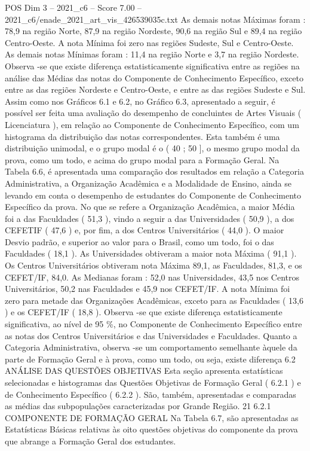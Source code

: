 \begin{textsample}{POS Dim 3 – 2021\_c6 – Score 7.00 – 2021\_c6/enade\_2021\_art\_vis\_426539035c.txt}
As demais notas Máximas foram : 78,9 na região Norte, 87,9 na região Nordeste, 90,6 na região Sul e 89,4 na região Centro-Oeste.
A nota Mínima foi zero nas regiões Sudeste, Sul e Centro-Oeste.
As demais notas Mínimas foram : 11,4 na região Norte e 3,7 na região Nordeste.
Observa -se que existe diferença estatisticamente significativa entre as regiões na análise das Médias das notas do Componente de Conhecimento Específico, exceto entre as das regiões Nordeste e Centro-Oeste, e entre as das regiões Sudeste e Sul.
Assim como nos Gráficos 6.1 e 6.2, no Gráfico 6.3, apresentado a seguir, é possível ser feita uma avaliação do desempenho de concluintes de Artes Visuais ( Licenciatura ), em relação ao Componente de Conhecimento Específico, com um histograma da distribuição das notas correspondentes.
Esta também é uma distribuição unimodal, e o grupo modal é o ( 40 ; 50 ], o mesmo grupo modal da prova, como um todo, e acima do grupo modal para a Formação Geral.
Na Tabela 6.6, é apresentada uma comparação dos resultados em relação a Categoria Administrativa, a Organização Acadêmica e a Modalidade de Ensino, ainda se levando em conta o desempenho de estudantes do Componente de Conhecimento Específico da prova.
No que se refere a Organização Acadêmica, a maior Média foi a das Faculdades ( 51,3 ), vindo a seguir a das Universidades ( 50,9 ), a dos CEFETIF ( 47,6 ) e, por fim, a dos Centros Universitários ( 44,0 ).
O maior Desvio padrão, e superior ao valor para o Brasil, como um todo, foi o das Faculdades ( 18,1 ).
As Universidades obtiveram a maior nota Máxima ( 91,1 ).
Os Centros Universitários obtiveram nota Máxima 89,1, as Faculdades, 81,3, e os CEFET/IF, 84,0.
As Medianas foram : 52,0 nas Universidades, 43,5 nos Centros Universitários, 50,2 nas Faculdades e 45,9 nos CEFET/IF.
A nota Mínima foi zero para metade das Organizações Acadêmicas, exceto para as Faculdades ( 13,6 ) e os CEFET/IF ( 18,8 ).
Observa -se que existe diferença estatisticamente significativa, ao nível de 95 \%, no Componente de Conhecimento Específico entre as notas dos Centros Universitários e das Universidades e Faculdades.
Quanto a Categoria Administrativa, observa -se um comportamento semelhante àquele da parte de Formação Geral e à prova, como um todo, ou seja, existe diferença 6.2 ANÁLISE DAS QUESTÕES OBJETIVAS Esta seção apresenta estatísticas selecionadas e histogramas das Questões Objetivas de Formação Geral ( 6.2.1 ) e de Conhecimento Específico ( 6.2.2 ).
São, também, apresentadas e comparadas as médias das subpopulações caracterizadas por Grande Região. 21 6.2.1 COMPONENTE DE FORMAÇÃO GERAL Na Tabela 6.7, são apresentadas as Estatísticas Básicas relativas às oito questões objetivas do componente da prova que abrange a Formação Geral dos estudantes.

\end{textsample}
